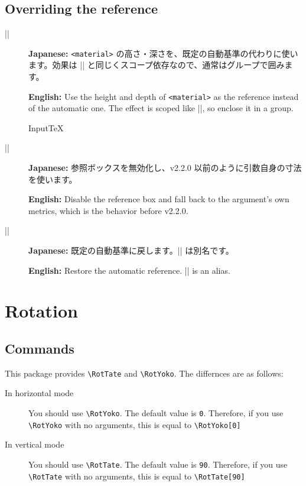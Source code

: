 \documentclass[luatex,fontsize=8pt,paper=b5,twoside]{jlreq}%
\begin{document}
\subsection{Overriding the reference}
\begin{description}
  \item[\KKverb||]
  \textbf{Japanese:} \verb|<material>| の高さ・深さを、既定の自動基準の代わりに使います。効果は \KKverb|\RotYoko| と同じくスコープ依存なので、通常はグループで囲みます。

  \textbf{English:} Use the height and depth of \verb|<material>| as the reference instead of the automatic one. The effect is scoped like \KKverb|\RotYoko|, so enclose it in a group.
  \begin{SourceCode}{Input}{TeX}
    {%
      }
  \end{SourceCode}
  \item[\KKverb|\kksrefoff|]
  \textbf{Japanese:} 参照ボックスを無効化し、v2.2.0 以前のように引数自身の寸法を使います。

  \textbf{English:} Disable the reference box and fall back to the argument's own metrics, which is the behavior before v2.2.0.
  \item[\KKverb|\kksrefauto|]
  \textbf{Japanese:} 既定の自動基準に戻します。\KKverb|\kksrefreset| は別名です。

  \textbf{English:} Restore the automatic reference. \KKverb|\kksrefreset| is an alias.
\end{description}


\section{Rotation}
\subsection{Commands}
This package provides \verb|\RotTate| and \verb|\RotYoko|. The differnces are as follows:

\begin{description}
  \item[In horizontal mode] You should use \verb|\RotYoko|. The default value is \verb|0|. Therefore, if you use \verb|\RotYoko| with no arguments, this is equal to \verb|\RotYoko[0]| 
  \item[In vertical mode] You should use \verb|\RotTate|. The default value is \verb|90|. Therefore, if you use \verb|\RotTate| with no arguments, this is equal to \verb|\RotTate[90]| 
\end{description}
\end{document}
